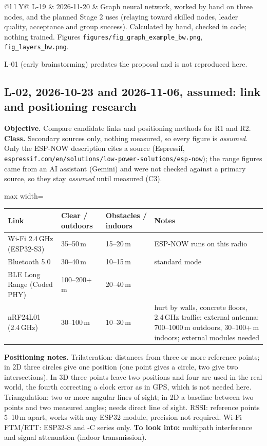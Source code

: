 \IfFileExists{IEEEtran.cls}{\documentclass[conference]{IEEEtran}}{\documentclass[10pt,twocolumn]{article}}
\newcommand{\fitcol}[1]{\begin{adjustbox}{max width=\columnwidth}#1\end{adjustbox}}
\begin{document}
\begin{table}[!t]
\begin{tabularx}{\textwidth}{@{}l l Y@{}}
L-19 & 2026-11-20 & Graph neural network, worked by hand on three nodes, and the planned Stage 2 uses (relaying toward skilled nodes, leader quality, acceptance and group success). Calculated by hand, checked in code; nothing trained. Figures \texttt{figures/fig\_graph\_example\_bw.png}, \texttt{fig\_layers\_bw.png}.\\
\bottomrule
\end{tabularx}

\end{table}
L-01 (early brainstorming) predates the proposal and is not reproduced here.

\subsection*{L-02, 2026-10-23 and 2026-11-06, assumed: link and positioning research}
\textbf{Objective.} Compare candidate links and positioning methods for R1 and R2. \textbf{Class.} Secondary sources only, nothing measured, so every figure is \emph{assumed}. Only the ESP-NOW description cites a source (Espressif, \texttt{espressif.com/en/solutions/\allowbreak low-power-solutions/\allowbreak esp-now}); the range figures came from an AI assistant (Gemini) and were not checked against a primary source, so they stay \emph{assumed} until measured (C3).

\begin{center}\footnotesize\setlength{\tabcolsep}{4pt}
\fitcol{\begin{tabular}{@{}l l l p{2.6in}@{}}
\toprule
Link & Clear / outdoors & Obstacles / indoors & Notes\\
\midrule
Wi-Fi 2.4\,GHz (ESP32-S3) & 35--50\,m & 15--20\,m & ESP-NOW runs on this radio\\
Bluetooth 5.0 & 30--40\,m & 10--15\,m & standard mode\\
BLE Long Range (Coded PHY) & 100--200+\,m & 20--40\,m & \\
nRF24L01 (2.4\,GHz) & 30--100\,m & 10--30\,m & hurt by walls, concrete floors, 2.4\,GHz traffic; external antenna: 700--1000\,m outdoors, 30--100+\,m indoors; external modules needed\\
\bottomrule
\end{tabular}}
\end{center}

\textbf{Positioning notes.} Trilateration: distances from three or more reference points; in 2D three circles give one position (one point gives a circle, two give two intersections). In 3D three points leave two positions and four are used in the real world, the fourth correcting a clock error as in GPS, which is not needed here. Triangulation: two or more angular lines of sight; in 2D a baseline between two points and two measured angles; needs direct line of sight. RSSI: reference points 5--10\,m apart, works with any ESP32 module, precision not required. Wi-Fi FTM/RTT: ESP32-S and -C series only. \textbf{To look into:} multipath interference and signal attenuation (indoor transmission).
\end{document}
